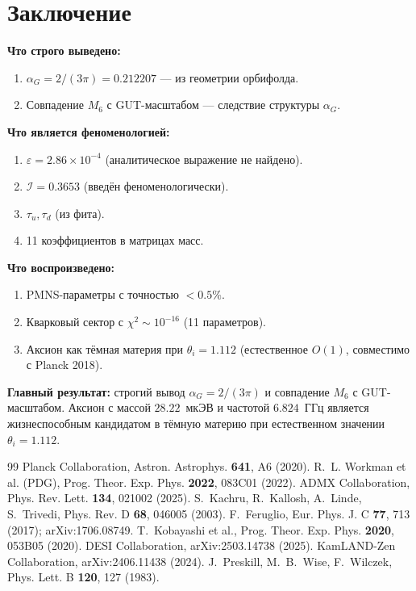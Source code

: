 \documentclass[12pt,a4paper]{article}
\numberwithin{equation}{section}
\begin{document}
\section{Заключение}

\textbf{Что строго выведено:}
\begin{enumerate}[leftmargin=1.5em]
\item $\alpha_G = 2/(3\pi) = 0.212207$ --- из геометрии орбифолда.
\item Совпадение $M_6$ с GUT-масштабом --- следствие структуры 
$\alpha_G$.
\end{enumerate}

\textbf{Что является феноменологией:}
\begin{enumerate}[leftmargin=1.5em]
\item $\varepsilon = 2.86\times 10^{-4}$ (аналитическое выражение 
не найдено).
\item $\mathcal{I} = 0.3653$ (введён феноменологически).
\item $\tau_u, \tau_d$ (из фита).
\item 11 коэффициентов в матрицах масс.
\end{enumerate}

\textbf{Что воспроизведено:}
\begin{enumerate}[leftmargin=1.5em]
\item PMNS-параметры с точностью $<0.5\%$.
\item Кварковый сектор с $\chi^2 \sim 10^{-16}$ (11 параметров).
\item Аксион как тёмная материя при $\theta_i = 1.112$ 
(естественное $O(1)$, совместимо с Planck 2018).
\end{enumerate}

\textbf{Главный результат:} строгий вывод $\alpha_G = 2/(3\pi)$ 
и совпадение $M_6$ с GUT-масштабом. Аксион с массой 
$28.22$~мкЭВ и частотой $6.824$~ГГц является жизнеспособным 
кандидатом в тёмную материю при естественном значении 
$\theta_i = 1.112$.

\begin{thebibliography}{99}
 Planck Collaboration, Astron. Astrophys. 
\textbf{641}, A6 (2020).
 R.~L. Workman et al. (PDG), 
Prog. Theor. Exp. Phys. \textbf{2022}, 083C01 (2022).
 ADMX Collaboration, Phys. Rev. Lett. 
\textbf{134}, 021002 (2025).
 S.~Kachru, R.~Kallosh, A.~Linde, S.~Trivedi, 
Phys. Rev. D \textbf{68}, 046005 (2003).
 F.~Feruglio, Eur. Phys. J. C \textbf{77}, 
713 (2017); arXiv:1706.08749.
 T.~Kobayashi et al., 
Prog. Theor. Exp. Phys. \textbf{2020}, 053B05 (2020).
 DESI Collaboration, arXiv:2503.14738 (2025).
 KamLAND-Zen Collaboration, 
arXiv:2406.11438 (2024).
 J.~Preskill, M.~B.~Wise, F.~Wilczek, 
Phys. Lett. B \textbf{120}, 127 (1983).
\end{thebibliography}
\end{document}
